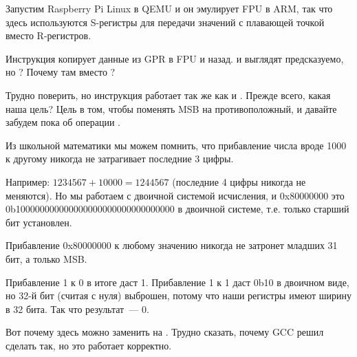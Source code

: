 

Запустим Raspberry Pi Linux в QEMU и он эмулирует FPU в ARM, так что здесь используются S-регистры
для передачи значений с плавающей точкой вместо R-регистров.

Инструкция \FMRS копирует данные из \ac{GPR} в FPU и назад.
 и  выглядят предсказуемо, но ?
Почему там \ADD вместо \XOR?

Трудно поверить, но инструкция 
 работает так же как и .
Прежде всего, какая наша цель?
Цель в том, чтобы поменять \ac{MSB} на противоположный, и давайте забудем пока об операции \XOR.

Из школьной математики мы можем помнить, что прибавление числа вроде 1000 к другому никогда не затрагивает последние 3 цифры.

Например: $1234567 + 10000 = 1244567$ (последние 4 цифры никогда не меняются).
Но мы работаем с двоичной системой исчисления, и 0x80000000 это 0b100000000000000000000000000000000
в двоичной системе, т.е. только старший бит установлен.

Прибавление 0x80000000 к любому значению никогда не затронет младших 31 бит, а только \ac{MSB}.

Прибавление 1 к 0 в итоге даст 1.
Прибавление 1 к 1 даст 0b10 в двоичном виде, но 32-й бит (считая с нуля) выброшен, 
потому что наши регистры имеют ширину в 32 бита. Так что результат~--- 0.

Вот почему \XOR здесь можно заменить на \ADD.
Трудно сказать, почему GCC решил сделать так, но это работает корректно.%

